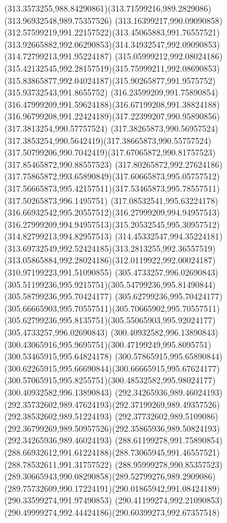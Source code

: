 {{		\curveto(313.3573255,988.84290861)(313.71599216,989.2829086)(313.96932548,989.75357526)
		\curveto(313.16399217,990.09090858)(312.57599219,991.22157522)(313.45065883,991.76557521)
		\curveto(313.92665882,992.06290853)(314.34932547,992.09090853)(314.72799213,991.95224187)
		\curveto(315.05999212,992.08024186)(315.42132545,992.28157519)(315.75999211,992.08690853)
		\curveto(315.83865877,992.04024187)(315.90265877,991.9575752)(315.93732543,991.8655752)
		\curveto(316.23599209,991.75890854)(316.47999209,991.59624188)(316.67199208,991.38824188)
		\curveto(316.96799208,991.22424189)(317.22399207,990.95890856)(317.3813254,990.57757524)
		\curveto(317.38265873,990.56957524)(317.3853254,990.5642419)(317.38665873,990.55757524)
		\curveto(317.50799206,990.7042419)(317.67065872,990.81757523)(317.85465872,990.88557523)
		\curveto(317.80265872,992.27624186)(317.75865872,993.65890849)(317.60665873,995.05757512)
		\curveto(317.56665873,995.42157511)(317.53465873,995.78557511)(317.50265873,996.1495751)
		\curveto(317.08532541,995.63224178)(316.66932542,995.20557512)(316.27999209,994.94957513)
		\curveto(316.27999209,994.94957513)(315.20532545,995.30957512)(314.82799213,994.82957513)
		\curveto(314.45332547,994.35224181)(313.69732549,992.52424185)(313.2813255,992.36557519)
		\curveto(313.05865884,992.28024186)(312.0119922,992.00024187)(310.97199223,991.51090855)
		\moveto(305.4733257,996.02690843)
		\curveto(305.51199236,995.9215751)(305.54799236,995.81490844)(305.58799236,995.70424177)
		\curveto(305.62799236,995.70424177)(305.66665903,995.70557511)(305.70665902,995.70557511)
		\curveto(305.62799236,995.8135751)(305.55065903,995.92024177)(305.4733257,996.02690843)
		\moveto(300.40932582,996.13890843)
		\curveto(300.43065916,995.9695751)(300.47199249,995.8095751)(300.53465915,995.64824178)
		\curveto(300.57865915,995.65890844)(300.62265915,995.66690844)(300.66665915,995.67624177)
		\curveto(300.57065915,995.8255751)(300.48532582,995.98024177)(300.40932582,996.13890843)
		\moveto(292.34265936,989.46024193)
		\curveto(292.35732602,989.47624193)(292.37199269,989.49357526)(292.38532602,989.51224193)
		\curveto(292.37732602,989.5109086)(292.36799269,989.50957526)(292.35865936,989.50824193)
		\lineto(292.34265936,989.46024193)
		\moveto(288.61199278,991.75890854)
		\curveto(288.66932612,991.61224188)(288.73065945,991.46557521)(288.78532611,991.31757522)
		\curveto(288.95999278,990.85357523)(289.30665943,990.08290858)(289.52799276,989.2909086)
		\curveto(289.75732609,990.17224191)(290.01865942,991.08424189)(290.33599274,991.97490853)
		\curveto(290.41199274,992.21090853)(290.49999274,992.44424186)(290.60399273,992.67357518)
}}
